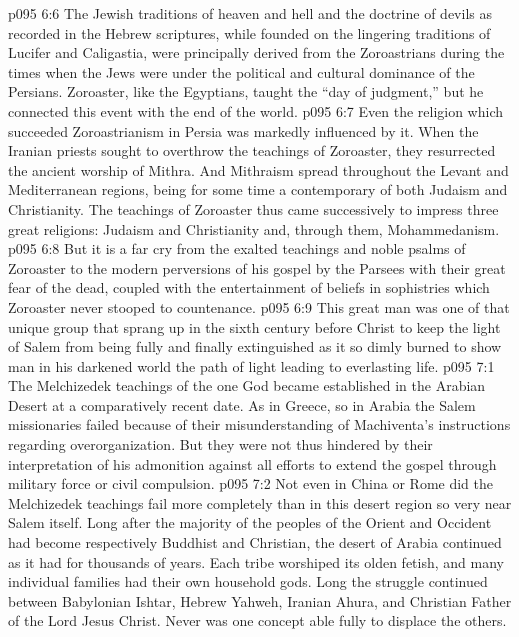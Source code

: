 \vs p095 6:6 The Jewish traditions of heaven and hell and the doctrine of devils as recorded in the Hebrew scriptures, while founded on the lingering traditions of Lucifer and Caligastia, were principally derived from the Zoroastrians during the times when the Jews were under the political and cultural dominance of the Persians. Zoroaster, like the Egyptians, taught the “day of judgment,” but he connected this event with the end of the world.\plusone
\vs p095 6:7 Even the religion which succeeded Zoroastrianism in Persia was markedly influenced by it. When the Iranian priests sought to overthrow the teachings of Zoroaster, they resurrected the ancient worship of Mithra. And Mithraism spread throughout the Levant and Mediterranean regions, being for some time a contemporary of both Judaism and Christianity. The teachings of Zoroaster thus came successively to impress three great religions: Judaism and Christianity and, through them, Mohammedanism.
\pc \vs p095 6:8 But it is a far cry from the exalted teachings and noble psalms of Zoroaster to the modern perversions of his gospel by the Parsees with their great fear of the dead, coupled with the entertainment of beliefs in sophistries which Zoroaster never stooped to countenance.
\vs p095 6:9 This great man was one of that unique group that sprang up in the sixth century before Christ to keep the light of Salem from being fully and finally extinguished as it so dimly burned to show man in his darkened world the path of light leading to everlasting life.
\vs p095 7:1 The Melchizedek teachings of the one God became established in the Arabian Desert at a comparatively recent date. As in Greece, so in Arabia the Salem missionaries failed because of their misunderstanding of Machiventa’s instructions regarding overorganization. But they were not thus hindered by their interpretation of his admonition against all efforts to extend the gospel through military force or civil compulsion.
\vs p095 7:2 Not even in China or Rome did the Melchizedek teachings fail more completely than in this desert region so very near Salem itself. Long after the majority of the peoples of the Orient and Occident had become respectively Buddhist and Christian, the desert of Arabia continued as it had for thousands of years. Each tribe worshiped its olden fetish, and many individual families had their own household gods. Long the struggle continued between Babylonian Ishtar, Hebrew Yahweh, Iranian Ahura, and Christian Father of the Lord Jesus Christ. Never was one concept able fully to displace the others.
